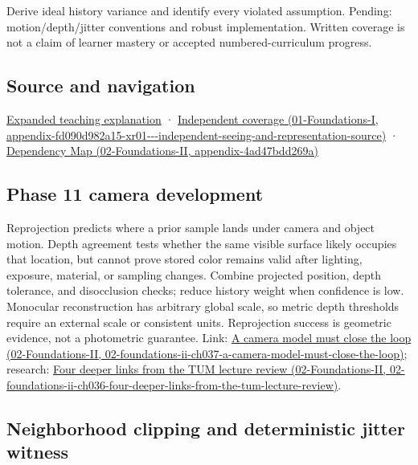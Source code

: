 Derive ideal history variance and identify every violated assumption. Pending: motion/depth/jitter conventions and robust implementation. Written coverage is not a claim of learner mastery or accepted numbered-curriculum progress.

\subsection{Source and navigation}\label{appendix-0727340a4428-source-and-navigation}

\hyperref[04-visual-computing-ii-ch042-temporal-reconstruction-is-an-inference-about-correspondence]{Expanded teaching explanation} · \href{../01-Foundations-I/main.pdf\#nameddest=appendix-fd090d982a15-xr01---independent-seeing-and-representation-source}{Independent coverage (01-Foundations-I, appendix-fd090d982a15-xr01-\/-\/-independent-seeing-and-representation-source)} · \href{../02-Foundations-II/main.pdf\#nameddest=appendix-4ad47bdd269a}{Dependency Map (02-Foundations-II, appendix-4ad47bdd269a)}

\subsection{Phase 11 camera development}\label{appendix-0727340a4428-phase-11-camera-development}

Reprojection predicts where a prior sample lands under camera and object motion. Depth agreement tests whether the same visible surface likely occupies that location, but cannot prove stored color remains valid after lighting, exposure, material, or sampling changes. Combine projected position, depth tolerance, and disocclusion checks; reduce history weight when confidence is low. Monocular reconstruction has arbitrary global scale, so metric depth thresholds require an external scale or consistent units. Reprojection success is geometric evidence, not a photometric guarantee. Link: \href{../02-Foundations-II/main.pdf\#nameddest=02-foundations-ii-ch037-a-camera-model-must-close-the-loop}{A camera model must close the loop (02-Foundations-II, 02-foundations-ii-ch037-a-camera-model-must-close-the-loop)}; research: \href{../02-Foundations-II/main.pdf\#nameddest=02-foundations-ii-ch036-four-deeper-links-from-the-tum-lecture-review}{Four deeper links from the TUM lecture review (02-Foundations-II, 02-foundations-ii-ch036-four-deeper-links-from-the-tum-lecture-review)}.

\subsection{Neighborhood clipping and deterministic jitter witness}\label{appendix-0727340a4428-neighborhood-clipping-and-deterministic-jitter-witness}

